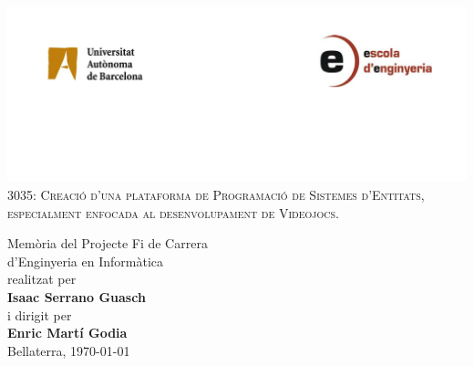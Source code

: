 \begin{titlepage}

\begin{center}


\includegraphics[width=1.00\textwidth]{./img/logoUAB.png}\\[1cm]    

\textsc{\LARGE 3035: Creació d'una plataforma de Programació de Sistemes d'Entitats, especialment enfocada al desenvolupament de Videojocs.}\\[1.5cm]



\end{center}

\begin{flushright}

\vfill

\begin{minipage}{0.4\textwidth}
\end{minipage}
\begin{minipage}{0.6\textwidth}
Memòria del Projecte Fi de Carrera \\
d'Enginyeria en Informàtica \\
realitzat per \\
{\bf Isaac Serrano Guasch} \\
i dirigit per \\
{\bf Enric Martí Godia} \\
Bellaterra, \today
\end{minipage}

\end{flushright}

\end{titlepage}